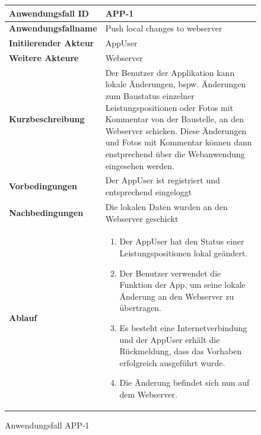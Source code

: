 \newpage

\begin{figure}[h]
	\centering
	\begin{tabularx}{\textwidth}{ X | X }
		\textbf{Anwendungsfall ID} & APP-1 \\ \hline
		\textbf{Anwendungsfallname} & Push local changes to webserver\\ \hline
		\textbf{Initiierender Akteur} & AppUser \\ \hline
		\textbf{Weitere Akteure} & Webserver  \\ \hline
		\textbf{Kurzbeschreibung} & Der Benutzer der Applikation kann lokale \"Anderungen,  bspw. \"Anderungen zum Baustatus einzelner Leistungspositionen oder Fotos mit Kommentar von der Baustelle,  an den Webserver schicken.  Diese \"Anderungen und Fotos mit Kommentar k\"onnen dann enstprechend  \"uber die Webanwendung eingesehen werden.  \\ \hline
		\textbf{Vorbedingungen} & Der AppUser ist registriert und entsprechend eingeloggt \\ \hline
		\textbf{Nachbedingungen} & Die lokalen Daten wurden an den Webserver geschickt\\ \hline
		\textbf{Ablauf} &
			\begin{enumerate}
				\item Der AppUser hat den Status einer Leistungspositionen  lokal ge\"andert.
				\item Der Benutzer verwendet die Funktion der App,  um seine lokale \"Anderung an den Webserver zu \"ubertragen.
				\item Es besteht eine Internetverbindung und der AppUser erh\"alt die R\"uckmeldung,  dass das Vorhaben erfolgreich ausgef\"uhrt wurde.  
				\item Die \"Anderung befindet sich nun auf dem Webserver.
			\end{enumerate}
			\end{tabularx}
	\caption{Anwendungsfall APP-1}
	\label{fig:anwendungsfall-app-tabelle-APP-1-1}
\end{figure}
